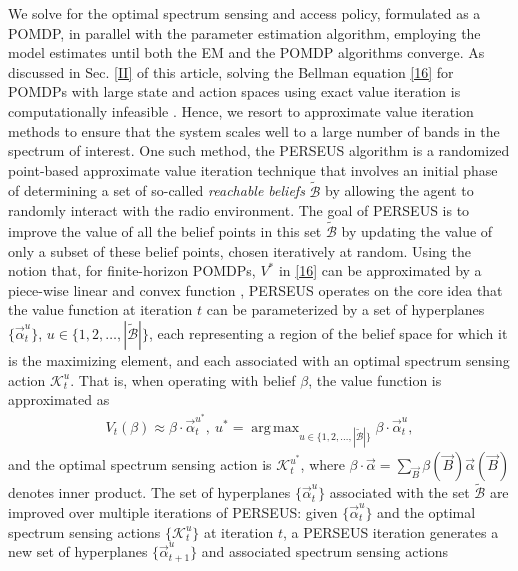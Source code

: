 \documentclass[10pt,twocolumn]{IEEEtran}
\DeclareMathOperator*{\argmax}{arg\,max}
\begin{document}
We solve for the optimal spectrum sensing and access policy, formulated as a POMDP, in parallel with the parameter estimation algorithm, employing the model estimates until both the EM and the POMDP algorithms converge. As discussed in Sec. \ref{II} of this article, solving the Bellman equation \eqref{16} for POMDPs with large state and action spaces using exact value iteration is computationally infeasible \cite{DBLP:journals/corr/abs-1109-2145}. Hence, we resort to approximate value iteration methods to ensure that the system scales well to a large number of bands in the spectrum of interest. One such method, the PERSEUS algorithm \cite{DBLP:journals/corr/abs-1109-2145} is a randomized point-based approximate value iteration technique that involves an initial phase of determining a set of so-called \emph{reachable beliefs} $\tilde{\mathcal{B}}$ by allowing the agent to randomly interact with the radio environment. The goal of PERSEUS is to improve the value of all the belief points in this set $\tilde{\mathcal{B}}$ by updating the value of only a subset of these belief points, chosen iteratively at random. Using the notion that, for finite-horizon POMDPs, $V^*$ in \eqref{16} can be approximated by a piece-wise linear and convex function \cite{DBLP:journals/corr/abs-1109-2145}, PERSEUS operates on the core idea that the value function at iteration $t$ can be parameterized by a set of hyperplanes $\{\vec{\alpha}_{t}^{u}\}$, $u {\in} \{1,2,\dots,|\tilde{\mathcal{B}}|\}$, each representing a region of the belief space for which it is the maximizing element, and each associated with an optimal spectrum sensing action $\mathcal K_t^{u}$. That is, when operating with belief $\beta$, the value function is approximated as
\begin{equation}
    \begin{aligned}\label{40}
        V_{t}(\beta) \approx \beta \cdot \vec{\alpha}_{t}^{u^*},
        \ 
        u^* = \argmax_{u\in\{1,2,\dots,|\tilde{\mathcal{B}}|\}} \beta \cdot \vec{\alpha}_{t}^{u},
    \end{aligned}
\end{equation}
and the optimal spectrum sensing action is $\mathcal K_t^{u^*}$, where $\beta\cdot\vec{\alpha}{=}\sum_{\vec{B}}\beta(\vec{B})\vec{\alpha}(\vec{B})$ denotes inner product. The set of hyperplanes $\{\vec{\alpha}_{t}^{u}\}$ associated with the set $\tilde{\mathcal{B}}$ are improved over multiple iterations of PERSEUS: given $\{\vec{\alpha}_{t}^{u}\}$ and the optimal spectrum sensing actions $\{\mathcal K_{t}^{u}\}$ at iteration $t$, a PERSEUS iteration generates a new set of hyperplanes $\{\vec{\alpha}_{t+1}^{u}\}$ and associated spectrum sensing actions
\end{document}
